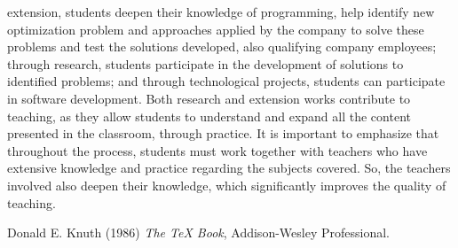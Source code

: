 \documentclass[preprint,12pt,authoryear]{elsarticle}
\begin{document}
extension, students deepen their knowledge of programming, help identify new optimization
problem and approaches applied by the company to solve these problems and test the
solutions developed, also qualifying company employees; through research, students
participate in the development of solutions to identified problems; and through technological
projects, students can participate in software development. Both research and extension
works contribute to teaching, as they allow students to understand and expand all the content
presented in the classroom, through practice. It is important to emphasize that throughout the
process, students must work together with teachers who have extensive knowledge and
practice regarding the subjects covered. So, the teachers involved also deepen their
knowledge, which significantly improves the quality of teaching.





\begin{thebibliography}{00}


\bibitem[ ()]{}

\end{thebibliography}
Donald E. Knuth (1986) \emph{The \TeX{} Book}, Addison-Wesley Professional.
\end{document}
